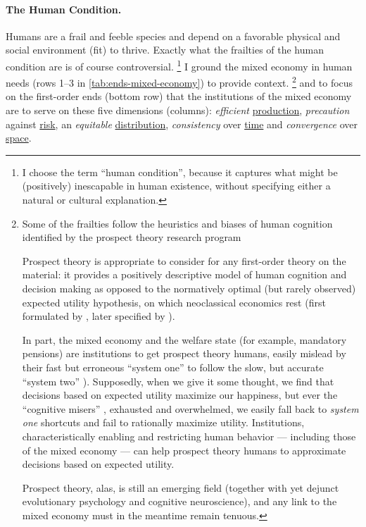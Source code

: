 \paragraph{The Human Condition.}
Humans are a frail and feeble species and depend on a favorable physical and social environment (fit) to thrive.
Exactly what the frailties of the human condition
are is of course controversial.
\footnote{\label{fn:human-condition}
	I choose the term ``human condition'', because it captures what might be (positively) inescapable in human existence, without specifying either a natural or cultural explanation.
}
I ground the mixed economy in human needs (rows 1--3 in \autoref{tab:ends-mixed-economy}) to provide context.
\footnote{
	Some of the frailties follow the heuristics and biases of human cognition identified by the prospect theory research program \citep{KahnemanTversky1979,Kahneman2011}

	Prospect theory is appropriate to consider for any first-order theory on the material:
	it provides a positively descriptive model of human cognition and decision making as opposed to the normatively optimal (but rarely observed) expected utility hypothesis, on which neoclassical economics rest (first formulated by \citealt{Bernoulli1738}, later specified by \citealt{VonNeumannMorgenstern1944}).

	In part, the mixed economy and the welfare state (for example, mandatory pensions) are institutions to get prospect theory humans, easily mislead by their fast but erroneous ``system one'' to follow the slow, but accurate ``system two'' \citep{Kahneman2011}).
	Supposedly, when we give it some thought, we find that decisions based on expected utility \citep{Bernoulli1738} maximize our happiness, but ever the ``cognitive misers'' \citep{FiskeTaylor-1991-aa}, exhausted and overwhelmed, we easily fall back to \emph{system one} shortcuts and fail to rationally maximize utility.
	Institutions, characteristically enabling and restricting human behavior --- including those of the mixed economy --- can help prospect theory humans to approximate decisions based on expected utility.

	Prospect theory, alas, is still an emerging field (together with yet dejunct evolutionary psychology and cognitive neuroscience), and any link to the mixed economy must in the meantime remain tenuous.
}
and to focus on the first-order ends (bottom row) that the institutions of the mixed economy are to serve on these five dimensions (columns):
\emph{efficient} \hyperref[sec:production]{production}, \emph{precaution} against \hyperref[sec:risk]{risk}, an \emph{equitable} \hyperref[sec:distribution]{distribution}, \emph{consistency} over \hyperref[sec:time]{time} and \emph{convergence} over \hyperref[sec:space]{space}.

